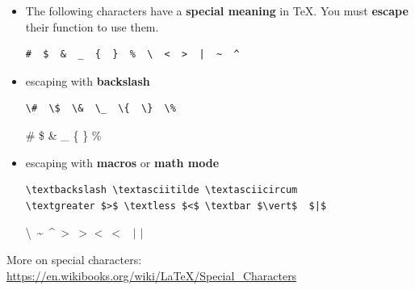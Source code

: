 \begin{frame}[fragile]

\begin{itemize}
	
		\item The following characters have a \textbf{special meaning} in \TeX . You must \textbf{escape} their function to use them.
	
\begin{lstlisting}
#  $  &  _  {  }  %  \  <  >  |  ~  ^  
\end{lstlisting}

\pause

	\item escaping with \textbf{backslash} 

\begin{lstlisting}
\#  \$  \&  \_  \{  \}  \%
\end{lstlisting}
	
	\ea \#  \$  \&  \_  \{  \}  \%
	\z 
	
\pause 
	
	\item escaping with \textbf{macros} or \textbf{math mode}

\begin{lstlisting}
\textbackslash \textasciitilde \textasciicircum 
\textgreater $>$ \textless $<$ \textbar $\vert$  $|$  
\end{lstlisting}	
	\ea \textbackslash\ \textasciitilde\ \textasciicircum\ 
	\textgreater\ $>$ \textless\ $<$ \textbar\ $\vert$  $|$  
	\z 
\end{itemize}

More on special characters: \url{https://en.wikibooks.org/wiki/LaTeX/Special_Characters}
\end{frame}


